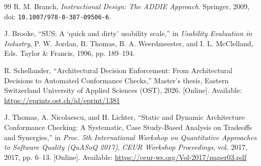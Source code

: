 \documentclass[12pt,a4paper,oneside]{report}
\begin{document}
\begin{thebibliography}{99}
R. M. Branch, \textit{Instructional Design: The ADDIE Approach}. Springer, 2009, doi: \nolinkurl{10.1007/978-0-387-09506-6}.

J. Brooke, ``SUS: A `quick and dirty' usability scale,'' in \textit{Usability Evaluation in Industry}, P. W. Jordan, B. Thomas, B. A. Weerdmeester, and I. L. McClelland, Eds. Taylor \& Francis, 1996, pp. 189--194.

R. Schellander, ``Architectural Decision Enforcement: From Architectural Decisions to Automated Conformance Checks,'' Master's thesis, Eastern Switzerland University of Applied Sciences (OST), 2026. [Online]. Available: \url{https://eprints.ost.ch/id/eprint/1381}

J. Thomas, A. Nicolaescu, and H. Lichter, ``Static and Dynamic Architecture Conformance Checking: A Systematic, Case Study-Based Analysis on Tradeoffs and Synergies,'' in \textit{Proc. 5th International Workshop on Quantitative Approaches to Software Quality (QuASoQ 2017)}, \textit{CEUR Workshop Proceedings}, vol. 2017, 2017, pp. 6--13. [Online]. Available: \url{https://ceur-ws.org/Vol-2017/paper03.pdf}

\end{thebibliography}
\end{document}
